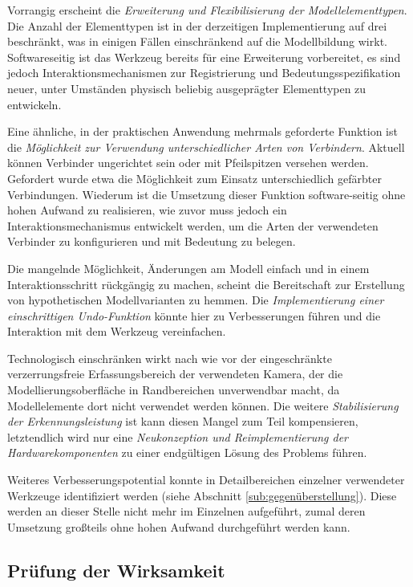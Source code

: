 Vorrangig erscheint die \emph{Erweiterung und Flexibilisierung der Modellelementtypen}. Die Anzahl der Elementtypen ist in der derzeitigen Implementierung auf drei beschränkt, was in einigen Fällen einschränkend auf die Modellbildung wirkt. Softwareseitig ist das Werkzeug bereits für eine Erweiterung vorbereitet, es sind jedoch Interaktionsmechanismen zur Registrierung und Bedeutungsspezifikation neuer, unter Umständen physisch beliebig ausgeprägter Elementtypen zu entwickeln.

Eine ähnliche, in der praktischen Anwendung mehrmals geforderte Funktion ist die \emph{Möglichkeit zur Verwendung unterschiedlicher Arten von Verbindern}. Aktuell können Verbinder ungerichtet sein oder mit Pfeilspitzen versehen werden. Gefordert wurde etwa die Möglichkeit zum Einsatz unterschiedlich gefärbter Verbindungen. Wiederum ist die Umsetzung dieser Funktion software-seitig ohne hohen Aufwand zu realisieren, wie zuvor muss jedoch ein Interaktionsmechanismus entwickelt werden, um die Arten der verwendeten Verbinder zu konfigurieren und mit Bedeutung zu belegen.

Die mangelnde Möglichkeit, Änderungen am Modell einfach und in einem Interaktionsschritt rückgängig zu machen, scheint die Bereitschaft zur Erstellung von hypothetischen Modellvarianten zu hemmen. Die \emph{Implementierung einer einschrittigen Undo-Funktion} könnte hier zu Verbesserungen führen und die Interaktion mit dem Werkzeug vereinfachen.

Technologisch einschränken wirkt nach wie vor der eingeschränkte verzerrungsfreie Erfassungsbereich der verwendeten Kamera, der die Modellierungsoberfläche in Randbereichen unverwendbar macht, da Modellelemente dort nicht verwendet werden können. Die weitere \emph{Stabilisierung der Erkennungsleistung} ist kann diesen Mangel zum Teil kompensieren, letztendlich wird nur eine \emph{Neukonzeption und Reimplementierung der Hardwarekomponenten} zu einer endgültigen Lösung des Problems führen.

Weiteres Verbesserungspotential konnte in Detailbereichen einzelner verwendeter Werkzeuge identifiziert werden (siehe Abschnitt \ref{sub:gegenüberstellung}). Diese werden an dieser Stelle nicht mehr im Einzelnen aufgeführt, zumal deren Umsetzung großteils ohne hohen Aufwand durchgeführt werden kann.


\subsection{Prüfung der Wirksamkeit} %
\label{sub:prüfung_der_wirksamkeit}

